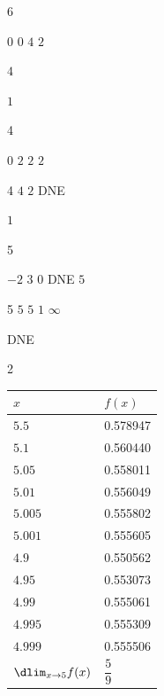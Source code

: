 \documentclass{book}
\begin{document}
\begin{appendices}
\rebootHW
\begin{enumerate}[!HW!]
\begin{multicols}{6}
\item $0$
\itemspade $0$
\itemspade $4$
\itemspade $2$
\item $4$
\item $1$
\end{multicols}
\begin{multicols}{4}
\item $0$
\itemspade  $2$
\itemspade  $2$
\itemspade  $2$
\end{multicols}
\begin{multicols}{4}
\itemspade  $4$
\itemspade  $2$
\itemspade  DNE
\item $1$
\end{multicols}
\begin{multicols}{5}
\item $-2$
\itemspade $3$
\itemspade $0$
\itemspade DNE
\itemspade $5$
\end{multicols}
\begin{multicols}{5}
\itemspade $5$
\itemspade $5$
\itemspade $1$
\itemspade $\infty$
\item DNE
\end{multicols}
\begin{multicols}{2}
\itemspade \mbox{}\vspace{-25pt}

\begin{tabular}{l|l}
$x$ & $f(x)$\\\hline
$5.5$ & 0.578947\\
$5.1$ & 0.560440\\
$5.05$ & 0.558011\\
$5.01$ & 0.556049\\
$5.005$ &  0.555802\\
$5.001$ & 0.555605\\
$4.9$ & 0.550562\\
$4.95$ & 0.553073\\
$4.99$ & 0.555061\\
$4.995$ & 0.555309\\
$4.999$ & 0.555506\\
$\dlim_{x\to5}f(x)$ & $\dfrac{5}{9}$
\end{tabular}
\itemspade \mbox{}\vspace{-25pt}


\end{multicols}
\end{enumerate}
\end{appendices}
\end{document}

